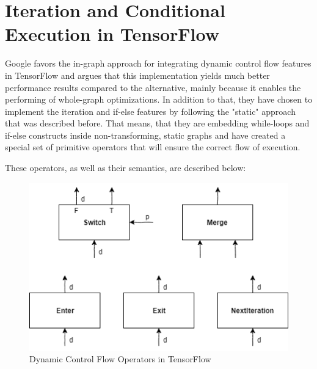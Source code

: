 \documentclass[ack,preface]{dithesis}
\begin{document}
    \section{Iteration and Conditional Execution in TensorFlow}
Google favors the in-graph approach for integrating dynamic control flow features in TensorFlow and argues that this implementation yields much better performance results compared to the alternative, mainly because it enables the performing of whole-graph optimizations. \cite{Yu:2018} In addition to that, they have chosen to implement the iteration and if-else features by following the "static" approach that was described before. That means, that they are embedding while-loops and if-else constructs inside non-transforming, static graphs and have created a special set of primitive operators that will ensure the correct flow of execution.

These operators, as well as their semantics, are described below:

\begin{figure}
\centering
\includegraphics[scale=0.8]{figures/TFoperators}
\caption{ Dynamic Control Flow Operators in TensorFlow}
\end{figure}
\end{document}
